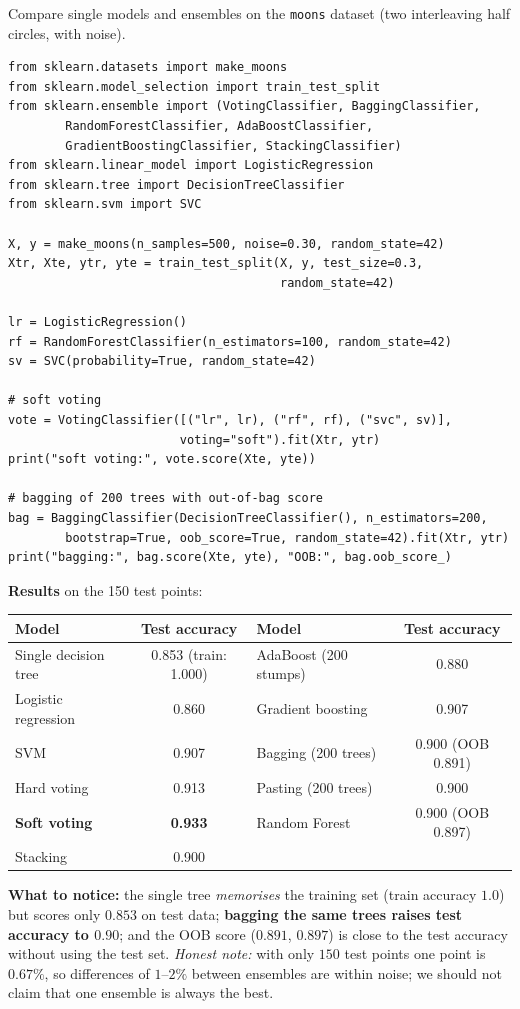 \begin{tryit}
Compare single models and ensembles on the \texttt{moons} dataset (two interleaving half circles, with noise).

\begin{lstlisting}
from sklearn.datasets import make_moons
from sklearn.model_selection import train_test_split
from sklearn.ensemble import (VotingClassifier, BaggingClassifier,
        RandomForestClassifier, AdaBoostClassifier,
        GradientBoostingClassifier, StackingClassifier)
from sklearn.linear_model import LogisticRegression
from sklearn.tree import DecisionTreeClassifier
from sklearn.svm import SVC

X, y = make_moons(n_samples=500, noise=0.30, random_state=42)
Xtr, Xte, ytr, yte = train_test_split(X, y, test_size=0.3,
                                      random_state=42)

lr = LogisticRegression()
rf = RandomForestClassifier(n_estimators=100, random_state=42)
sv = SVC(probability=True, random_state=42)

# soft voting
vote = VotingClassifier([("lr", lr), ("rf", rf), ("svc", sv)],
                        voting="soft").fit(Xtr, ytr)
print("soft voting:", vote.score(Xte, yte))

# bagging of 200 trees with out-of-bag score
bag = BaggingClassifier(DecisionTreeClassifier(), n_estimators=200,
        bootstrap=True, oob_score=True, random_state=42).fit(Xtr, ytr)
print("bagging:", bag.score(Xte, yte), "OOB:", bag.oob_score_)
\end{lstlisting}

\textbf{Results} on the 150 test points:

\medskip
\begin{center}
\begin{tabular}{@{}lc@{\qquad}lc@{}}
\toprule
\textbf{Model} & \textbf{Test accuracy} & \textbf{Model} & \textbf{Test accuracy}\\
\midrule
Single decision tree & 0.853 (train: 1.000) & AdaBoost (200 stumps) & 0.880\\
Logistic regression & 0.860 & Gradient boosting & 0.907\\
SVM & 0.907 & Bagging (200 trees) & 0.900 (OOB 0.891)\\
Hard voting & 0.913 & Pasting (200 trees) & 0.900\\
\textbf{Soft voting} & \textbf{0.933} & Random Forest & 0.900 (OOB 0.897)\\
Stacking & 0.900 & & \\
\bottomrule
\end{tabular}
\end{center}

\medskip
\textbf{What to notice:} the single tree \emph{memorises} the training set (train accuracy $1.0$) but scores only $0.853$ on test data; \textbf{bagging the same trees raises test accuracy to $0.90$}; and the OOB score ($0.891$, $0.897$) is close to the test accuracy without using the test set. \emph{Honest note:} with only $150$ test points one point is $0.67\%$, so differences of $1$--$2\%$ between ensembles are within noise; we should not claim that one ensemble is always the best.
\end{tryit}

